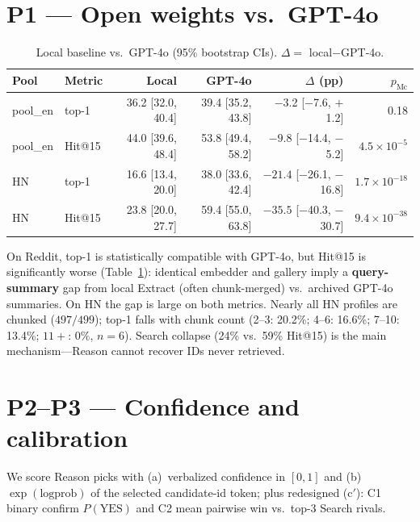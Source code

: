 \documentclass[sigplan,screen,nonacm,10pt]{acmart}
\begin{document}
\section{P1 --- Open weights vs.\ GPT-4o}

\begin{table}[t]
\centering
\caption{Local baseline vs.\ GPT-4o (95\% bootstrap CIs). $\Delta=$ local$-$GPT-4o.}
\label{tab:p1}
\small
\begin{tabular}{@{}llrrrr@{}}
\toprule
Pool & Metric & Local & GPT-4o & $\Delta$ (pp) & $p_{\mathrm{Mc}}$ \\
\midrule
pool\_en & top-1 & 36.2 [32.0, 40.4] & 39.4 [35.2, 43.8] & $-$3.2 [$-$7.6, $+$1.2] & 0.18 \\
pool\_en & Hit@15 & 44.0 [39.6, 48.4] & 53.8 [49.4, 58.2] & $\mathbf{-9.8}$ [$-$14.4, $-$5.2] & $4.5{\times}10^{-5}$ \\
HN & top-1 & 16.6 [13.4, 20.0] & 38.0 [33.6, 42.4] & $\mathbf{-21.4}$ [$-$26.1, $-$16.8] & $1.7{\times}10^{-18}$ \\
HN & Hit@15 & 23.8 [20.0, 27.7] & 59.4 [55.0, 63.8] & $\mathbf{-35.5}$ [$-$40.3, $-$30.7] & $9.4{\times}10^{-38}$ \\
\bottomrule
\end{tabular}
\end{table}

On Reddit, top-1 is statistically compatible with GPT-4o, but Hit@15 is
significantly worse (Table~\ref{tab:p1}): identical embedder and gallery imply a
\textbf{query-summary} gap from local Extract (often chunk-merged) vs.\ archived
GPT-4o summaries. On HN the gap is large on both metrics. Nearly all HN profiles
are chunked ($497/499$); top-1 falls with chunk count (2--3: 20.2\%; 4--6:
16.6\%; 7--10: 13.4\%; $11{+}$: $0\%$, $n{=}6$). Search collapse (24\% vs.\ 59\%
Hit@15) is the main mechanism---Reason cannot recover IDs never retrieved.

\section{P2--P3 --- Confidence and calibration}

We score Reason picks with (a)~verbalized confidence in $[0,1]$ and
(b)~$\exp(\mathrm{logprob})$ of the selected candidate-id token; plus redesigned
(c$'$): C1 binary confirm $P(\mathrm{YES})$ and C2 mean pairwise win vs.\ top-3
Search rivals.
\end{document}
